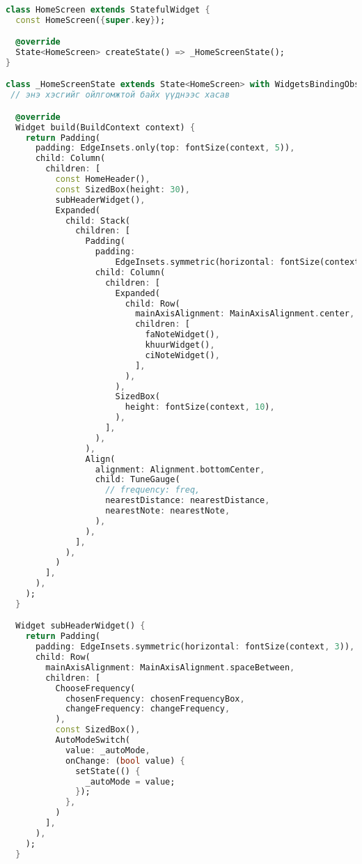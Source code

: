 \begin{lstlisting}[language=Dart, caption=Нүүр хуудсын зуралт ба хэрэгжүүлэлт, frame=single]

class HomeScreen extends StatefulWidget {
  const HomeScreen({super.key});

  @override
  State<HomeScreen> createState() => _HomeScreenState();
}

class _HomeScreenState extends State<HomeScreen> with WidgetsBindingObserver {
 // энэ хэсгийг ойлгомжтой байх үүднээс хасав

  @override
  Widget build(BuildContext context) {
    return Padding(
      padding: EdgeInsets.only(top: fontSize(context, 5)),
      child: Column(
        children: [
          const HomeHeader(),
          const SizedBox(height: 30),
          subHeaderWidget(),
          Expanded(
            child: Stack(
              children: [
                Padding(
                  padding:
                      EdgeInsets.symmetric(horizontal: fontSize(context, 2)),
                  child: Column(
                    children: [
                      Expanded(
                        child: Row(
                          mainAxisAlignment: MainAxisAlignment.center,
                          children: [
                            faNoteWidget(),
                            khuurWidget(),
                            ciNoteWidget(),
                          ],
                        ),
                      ),
                      SizedBox(
                        height: fontSize(context, 10),
                      ),
                    ],
                  ),
                ),
                Align(
                  alignment: Alignment.bottomCenter,
                  child: TuneGauge(
                    // frequency: freq,
                    nearestDistance: nearestDistance,
                    nearestNote: nearestNote,
                  ),
                ),
              ],
            ),
          )
        ],
      ),
    );
  }

  Widget subHeaderWidget() {
    return Padding(
      padding: EdgeInsets.symmetric(horizontal: fontSize(context, 3)),
      child: Row(
        mainAxisAlignment: MainAxisAlignment.spaceBetween,
        children: [
          ChooseFrequency(
            chosenFrequency: chosenFrequencyBox,
            changeFrequency: changeFrequency,
          ),
          const SizedBox(),
          AutoModeSwitch(
            value: _autoMode,
            onChange: (bool value) {
              setState(() {
                _autoMode = value;
              });
            },
          )
        ],
      ),
    );
  }


\end{lstlisting}
